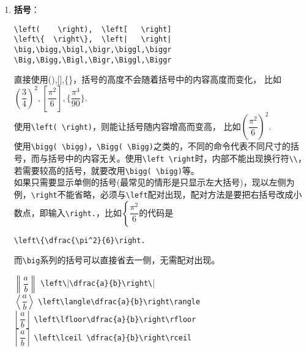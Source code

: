 \documentclass{article}
\newcommand{\q}{\quad}
\begin{document}
\begin{multicols}{2}
\begin{enumerate}
\item \textbf{括号}：
\begin{lstlisting}
\left(    \right),  \left[   \right]
\left\{  \right\},  \left|   \right|
\big,\bigg,\bigl,\bigr,\biggl,\biggr 
\Big,\Bigg,\Bigl,\Bigr,\Biggl,\Biggr
\end{lstlisting} 
直接使用(),[],\{\}，括号的高度不会随着括号中的内容高度而变化，
比如$ (\dfrac{3}{4})^2,[\dfrac{\pi^2}{6}],\{\dfrac{\pi^4}{90}\} $.\\
使用\verb|\left( \right)|，则能让括号随内容增高而变高，
比如$ \left(\dfrac{\pi^2}{6}\right)^2 $. \\
使用\verb|\bigg( \bigg)|，\verb|\Bigg( \Bigg)|之类的，不同的命令代表不同尺寸的括号，而与括号中的内容无关。使用\verb|\left \right|时，内部不能出现换行符\verb|\\|，
若需要较高的括号，就要改用\verb|\bigg( \bigg)|等。\\ 
如果只需要显示单侧的括号(最常见的情形是只显示左大括号)，现以左侧为例，\verb|\right|不能省略，必须与\verb|\left|配对出现，配对方法是要把右括号改成小数点，即输入\verb|\right.|，比如$ \left\{\dfrac{\pi^2}{6}\right. $的代码是
\begin{lstlisting}
\left\{\dfrac{\pi^2}{6}\right.    
\end{lstlisting} 
而\verb|\big|系列的括号可以直接省去一侧，无需配对出现。

$ \left\| \dfrac{a}{b} \right\| $\q 
\verb|\left\||\verb|\dfrac{a}{b}\right\|| \\
$ \left\langle \dfrac{a}{b} \right\rangle $\q 
\verb|\left\langle\dfrac{a}{b}\right\rangle| \\
$ \left\lfloor \dfrac{a}{b} \right\rfloor $\q 
\verb|\left\lfloor\dfrac{a}{b}\right\rfloor| \\
$ \left\lceil  \dfrac{a}{b} \right\rceil $\q 
\verb|\left\lceil \dfrac{a}{b}\right\rceil | 



\end{enumerate}
\end{multicols}
\end{document}
